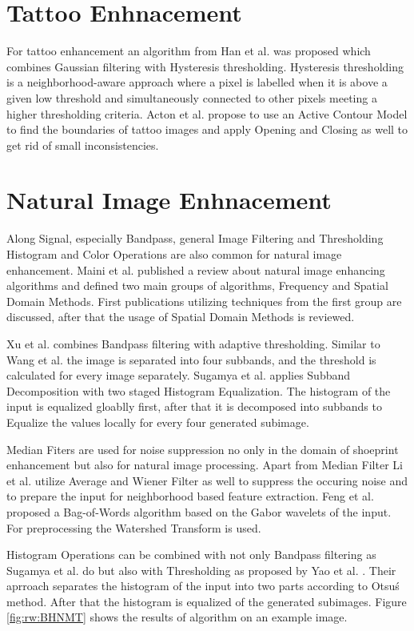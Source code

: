 \documentclass[draft,final]{vutinfth} %
\begin{document}
\section*{Tattoo Enhnacement}

For tattoo enhancement an algorithm from Han et al. \cite{han2013tattoo} was proposed which combines Gaussian filtering with Hysteresis thresholding. 
Hysteresis thresholding is a neighborhood-aware approach where a pixel is labelled when it is above a given low threshold and simultaneously connected to other pixels meeting a higher thresholding criteria. 
Acton et al. \cite{acton2008matching} propose to use an Active Contour Model to find the boundaries of tattoo images and apply Opening and Closing as well to get rid of small inconsistencies.

\section*{Natural Image Enhnacement}
\par
Along Signal, especially Bandpass, general Image Filtering and Thresholding Histogram and Color Operations are also common for natural image enhancement.
Maini et al. \cite{maini2010comprehensive} published a review about natural image enhancing algorithms and defined two main groups of algorithms, Frequency and Spatial Domain Methods.
First publications utilizing techniques from the first group are discussed, after that the usage of Spatial Domain Methods is reviewed.
\par
Xu et al. \cite{xu2016image} combines Bandpass filtering with adaptive thresholding.
Similar to Wang et al. \cite{wang2014enhanced} the image is separated into four subbands, and the threshold is calculated for every image separately.
Sugamya et al. \cite{sugamya2016image} applies Subband Decomposition with two staged Histogram Equalization.
The histogram of the input is equalized gloablly first, after that it is decomposed into subbands to Equalize the values locally for every four generated subimage.
\par
Median Fiters are used for noise suppression no only in the domain of shoeprint enhancement \cite{alizadeh2017automatic} but also for natural image processing.
Apart from Median Filter Li et al. \cite{li2014rapid} utilize Average and Wiener Filter as well to suppress the occuring noise and to prepare the input for neighborhood based feature extraction.
Feng et al. \cite{feng2011bag} proposed a Bag-of-Words algorithm based on the Gabor wavelets of the input. 
For preprocessing the Watershed Transform is used.
\par
Histogram Operations can be combined with not only Bandpass filtering as Sugamya et al. \cite{sugamya2016image} do but also with Thresholding as proposed by Yao et al. \cite{yao2016image}.
Their aprroach separates the histogram of the input into two parts according to Otsu\'s method.
After that the histogram is equalized of the generated subimages.
Figure \ref{fig:rw:BHNMT} shows the results of algorithm on an example image.
\end{document}
